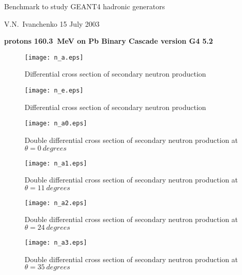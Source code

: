 \documentclass[12pt]{article}
\begin{document}
\pagestyle{empty}

\begin{center}
{\large Benchmark to study GEANT4 hadronic generators}

\vspace*{5mm}
{V.N.~Ivanchenko 15 July 2003}

\vspace*{5mm}


\vspace*{5mm}

{\bf protons 160.3~MeV on Pb Binary Cascade version G4 5.2}

\vspace*{1mm}


\end{center}


\begin{figure}[htbp]
\caption{Differential cross section of secondary neutron production}
\label{fig10}
\centerline{\texttt{[image: n\_a.eps]}}
\end{figure}

\begin{figure}[htbp]
\caption{Differential cross section of secondary neutron production}
\label{fig7}
\centerline{\texttt{[image: n\_e.eps]}}
\end{figure}




\clearpage


\begin{figure}[htbp]
\caption{Double differential cross section of secondary neutron production at $\theta = 0~degrees$}
\label{figa0}
\centerline{\texttt{[image: n\_a0.eps]}}
\end{figure}

\begin{figure}[htbp]
\caption{Double differential cross section of secondary neutron production at $\theta = 11~degrees$}
\label{figa1}
\centerline{\texttt{[image: n\_a1.eps]}}
\end{figure}

\begin{figure}[htbp]
\caption{Double differential cross section of secondary neutron production at $\theta = 24~degrees$}
\label{figa2}
\centerline{\texttt{[image: n\_a2.eps]}}
\end{figure}

\clearpage

\begin{figure}[htbp]
\caption{Double differential cross section of secondary neutron production at $\theta = 35~degrees$}
\label{figa3}
\centerline{\texttt{[image: n\_a3.eps]}}
\end{figure}
\end{document}
